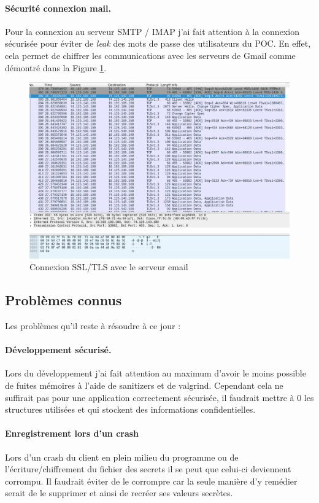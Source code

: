 \paragraph*{Sécurité connexion mail.}
Pour la connexion au serveur SMTP / IMAP j'ai fait attention à la connexion sécurisée pour éviter de \textit{leak} des mots de passe des utilisateurs du POC. En effet, cela permet de chiffrer les communications avec les serveurs de Gmail comme démontré dans la Figure \ref{fig:securityProofEmail}.
\begin{figure}[h!]
	\centering
	\includegraphics[width=14cm]{images/packetProofEncrypted.png}
	\caption{Connexion SSL/TLS avec le serveur email}
	\label{fig:securityProofEmail}
\end{figure}
\subsection{Problèmes connus}
Les problèmes qu'il reste à résoudre à ce jour :
\paragraph*{Développement sécurisé.}
Lors du développement j'ai fait attention au maximum d'avoir le moins possible de fuites mémoires à l'aide de sanitizers et de valgrind. Cependant cela ne suffirait pas pour une application correctement sécurisée, il faudrait mettre à 0 les structures utilisées et qui stockent des informations confidentielles.
\paragraph*{Enregistrement lors d'un crash}
Lors d'un crash du client en plein milieu du programme ou de l'écriture/chiffrement du fichier des secrets il se peut que celui-ci deviennent corrompu. Il faudrait éviter de le corrompre car la seule manière d'y remédier serait de le supprimer et ainsi de recréer ses valeurs secrètes.
